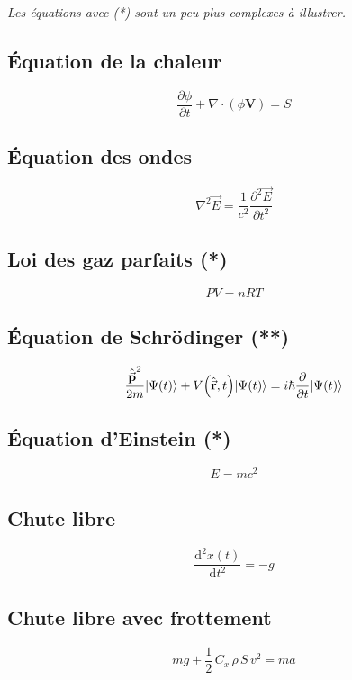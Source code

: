 \documentclass[12pt]{article}
\begin{document}
\textit{Les équations avec (*) sont un peu plus complexes à illustrer.}
\begin{multicols}{2}

\subsection*{Équation de la chaleur}

$$ \frac {\partial \phi }{\partial t} +\nabla \cdot (\phi \mathbf {V} )=S $$

\subsection*{Équation des ondes}

$$ \nabla ^{2}{\vec {E}} = {\frac {1}{c^{2}}}{\frac {\partial ^{2}{\vec {E}}}{\partial t^{2}}} $$

\subsection*{Loi des gaz parfaits (*)}

$$ PV = nRT $$

\subsection*{Équation de Schrödinger (**)}

$$ {\frac {{\hat {\vec {\mathbf {p} }}}^{2}}{2m}}|\Psi (t)\rangle + V{\Bigl (}{\hat {\vec {\mathbf {r} }}},t{\Bigr )}|\Psi (t)\rangle =i\hbar {\partial \over \partial t}|\Psi (t) \rangle $$

\subsection*{Équation d'Einstein (*)}

$$ E = mc^2 $$

\subsection*{Chute libre}

$$  \frac {\mathrm {d} ^{2}x(t)}{\mathrm {d} t^{2}} = -g $$

\subsection*{Chute libre avec frottement}

$$ mg + {\frac {1}{2}}\,C_{x}\,\rho \,S\,v^{2} = ma $$


\end{multicols}
\end{document}
